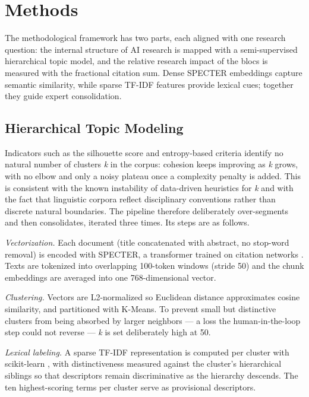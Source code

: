\documentclass{article}
\let\cite\parencite
\begin{document}
	\section{Methods}
	
	The methodological framework has two parts, each aligned with one research question: the internal structure of AI research is mapped with a semi-supervised hierarchical topic model, and the relative research impact of the blocs is measured with the fractional citation sum. Dense SPECTER embeddings capture semantic similarity, while sparse TF-IDF features provide lexical cues; together they guide expert consolidation.
	
	\subsection{Hierarchical Topic Modeling}
	\label{sec:topic_modeling_method}
	
	Indicators such as the silhouette score and entropy-based criteria identify no natural number of clusters \textit{k} in the corpus: cohesion keeps improving as \textit{k} grows, with no elbow and only a noisy plateau once a complexity penalty is added. This is consistent with the known instability of data-driven heuristics for \textit{k} \cite{bulatov2024determination} and with the fact that linguistic corpora reflect disciplinary conventions rather than discrete natural boundaries. The pipeline therefore deliberately over-segments and then consolidates, iterated three times. Its steps are as follows.
	
	\textit{Vectorization.} Each document (title concatenated with abstract, no stop-word removal) is encoded with SPECTER, a transformer trained on citation networks \cite{cohan2020specter}. Texts are tokenized into overlapping 100-token windows (stride 50) and the chunk embeddings are averaged into one 768-dimensional vector.
	
	\textit{Clustering.} Vectors are L2-normalized so Euclidean distance approximates cosine similarity, and partitioned with K-Means. To prevent small but distinctive clusters from being absorbed by larger neighbors --- a loss the human-in-the-loop step could not reverse --- \textit{k} is set deliberately high at 50.
	
	\textit{Lexical labeling.} A sparse TF-IDF representation is computed per cluster with scikit-learn \cite{pedregosa2011scikit}, with distinctiveness measured against the cluster's hierarchical siblings so that descriptors remain discriminative as the hierarchy descends. The ten highest-scoring terms per cluster serve as provisional descriptors.
	
\end{document}

